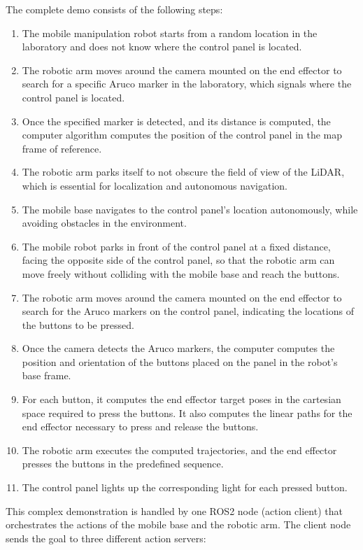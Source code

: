 The complete demo consists of the following steps:
\begin{enumerate}
    \item The mobile manipulation robot starts from a random location in the laboratory and does not know 
    where the control panel is located.
    \item The robotic arm moves around the camera mounted on the end effector to search for a specific Aruco marker 
    in the laboratory, which signals where the control panel is located.
    \item Once the specified marker is detected, and its distance is computed, the computer algorithm computes the
    position of the control panel in the map frame of reference.
    \item The robotic arm parks itself to not obscure the field of view of the LiDAR, which is essential for 
    localization and autonomous navigation.
    \item The mobile base navigates to the control panel's location autonomously, while avoiding obstacles in the
    environment.
    \item The mobile robot parks in front of the control panel at a fixed distance, facing the opposite side of the control panel,
    so that the robotic arm can move freely without colliding with the mobile base and reach the buttons.
    \item The robotic arm moves around the camera mounted on the end effector to search for the Aruco markers
    on the control panel, indicating the locations of the buttons to be pressed.
    \item Once the camera detects the Aruco markers, the computer computes the position and orientation
    of the buttons placed on the panel in the robot's base frame.
    \item For each button, it computes the end effector target poses in the cartesian space required to press the buttons.
    It also computes the linear paths for the end effector necessary to press and release the buttons.
    \item The robotic arm executes the computed trajectories, and the end effector presses the buttons in the predefined sequence.
    \item The control panel lights up the corresponding light for each pressed button.
\end{enumerate}

This complex demonstration is handled by one ROS2 node (action client) that orchestrates the actions of the mobile base
and the robotic arm. The client node sends the goal to three different action servers:

